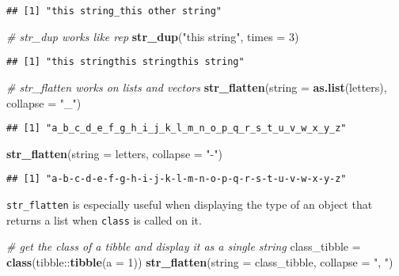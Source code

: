\documentclass[
]{book}
\newenvironment{Shaded}{}{}
\newcommand{\CommentTok}[1]{\textcolor[rgb]{0.38,0.63,0.69}{\textit{#1}}}
\newcommand{\DataTypeTok}[1]{\textcolor[rgb]{0.56,0.13,0.00}{#1}}
\newcommand{\DecValTok}[1]{\textcolor[rgb]{0.25,0.63,0.44}{#1}}
\newcommand{\KeywordTok}[1]{\textcolor[rgb]{0.00,0.44,0.13}{\textbf{#1}}}
\newcommand{\NormalTok}[1]{#1}
\newcommand{\OperatorTok}[1]{\textcolor[rgb]{0.40,0.40,0.40}{#1}}
\newcommand{\StringTok}[1]{\textcolor[rgb]{0.25,0.44,0.63}{#1}}
\begin{document}
\begin{verbatim}
## [1] "this string_this other string"
\end{verbatim}

\begin{Shaded}
\begin{Highlighting}[]
\CommentTok{# str_dup works like rep}
\KeywordTok{str_dup}\NormalTok{(}\StringTok{"this string"}\NormalTok{, }\DataTypeTok{times =} \DecValTok{3}\NormalTok{)}
\end{Highlighting}
\end{Shaded}

\begin{verbatim}
## [1] "this stringthis stringthis string"
\end{verbatim}

\begin{Shaded}
\begin{Highlighting}[]
\CommentTok{# str_flatten works on lists and vectors}
\KeywordTok{str_flatten}\NormalTok{(}\DataTypeTok{string =} \KeywordTok{as.list}\NormalTok{(letters), }\DataTypeTok{collapse =} \StringTok{"_"}\NormalTok{)}
\end{Highlighting}
\end{Shaded}

\begin{verbatim}
## [1] "a_b_c_d_e_f_g_h_i_j_k_l_m_n_o_p_q_r_s_t_u_v_w_x_y_z"
\end{verbatim}

\begin{Shaded}
\begin{Highlighting}[]
\KeywordTok{str_flatten}\NormalTok{(}\DataTypeTok{string =}\NormalTok{ letters, }\DataTypeTok{collapse =} \StringTok{"-"}\NormalTok{)}
\end{Highlighting}
\end{Shaded}

\begin{verbatim}
## [1] "a-b-c-d-e-f-g-h-i-j-k-l-m-n-o-p-q-r-s-t-u-v-w-x-y-z"
\end{verbatim}

\texttt{str\_flatten} is especially useful when displaying the type of an object that returns a list when \texttt{class} is called on it.

\begin{Shaded}
\begin{Highlighting}[]
\CommentTok{# get the class of a tibble and display it as a single string}
\NormalTok{class_tibble =}\StringTok{ }\KeywordTok{class}\NormalTok{(tibble}\OperatorTok{::}\KeywordTok{tibble}\NormalTok{(}\DataTypeTok{a =} \DecValTok{1}\NormalTok{))}
\KeywordTok{str_flatten}\NormalTok{(}\DataTypeTok{string =}\NormalTok{ class_tibble, }\DataTypeTok{collapse =} \StringTok{", "}\NormalTok{)}
\end{Highlighting}
\end{Shaded}
\end{document}
